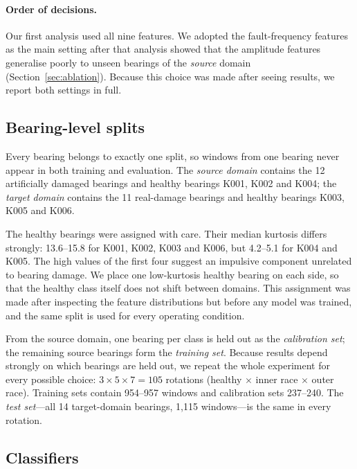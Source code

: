 \paragraph{Order of decisions.} Our first analysis used all nine features. We adopted the fault-frequency features as
the main setting after that analysis showed that the amplitude features generalise poorly to unseen bearings of the
\emph{source} domain (Section~\ref{sec:ablation}). Because this choice was made after seeing results, we report both
settings in full.

\subsection{Bearing-level splits}
\label{sec:splits}

Every bearing belongs to exactly one split, so windows from one bearing never appear in both training and
evaluation. The \emph{source domain} contains the 12 artificially damaged bearings and healthy bearings K001, K002
and K004; the \emph{target domain} contains the 11 real-damage bearings and healthy bearings K003, K005 and K006.

The healthy bearings were assigned with care. Their median kurtosis differs strongly: 13.6--15.8 for K001, K002,
K003 and K006, but 4.2--5.1 for K004 and K005. The high values of the first four suggest an impulsive component
unrelated to bearing damage. We place one low-kurtosis healthy bearing on each side, so that the healthy class itself does not shift between domains.
This assignment was made after inspecting the feature distributions but before any model was trained, and the same
split is used for every operating condition.

From the source domain, one bearing per class is held out as the \emph{calibration set}; the remaining source
bearings form the \emph{training set}. Because results depend strongly on which bearings are held out, we repeat the
whole experiment for every possible choice: $3 \times 5 \times 7 = 105$ rotations (healthy $\times$ inner race
$\times$ outer race). Training sets contain 954--957 windows and calibration sets 237--240. The \emph{test set}---all
14 target-domain bearings, 1{,}115 windows---is the same in every rotation.

\subsection{Classifiers}

